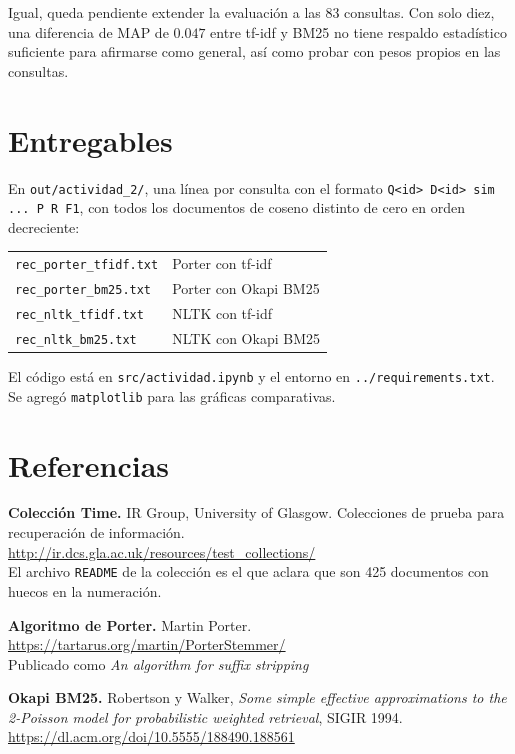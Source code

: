 \documentclass[11pt,letterpaper]{article}
\begin{document}
Igual, queda pendiente extender la evaluación a las 83 consultas. Con solo
diez, una diferencia de MAP de $0.047$ entre tf-idf y BM25 no tiene
respaldo estadístico suficiente para afirmarse como general, así como
probar con pesos propios en las consultas.

\section*{Entregables}

En \texttt{out/actividad\_2/}, una línea por consulta con el formato
\texttt{Q<id> D<id> sim ... P R F1}, con todos los documentos de
coseno distinto de cero en orden decreciente:

\begin{center}
\begin{tabular}{ll}
    \toprule
    \texttt{rec\_porter\_tfidf.txt} & Porter con tf-idf \\
    \texttt{rec\_porter\_bm25.txt}  & Porter con Okapi BM25 \\
    \texttt{rec\_nltk\_tfidf.txt}   & NLTK con tf-idf \\
    \texttt{rec\_nltk\_bm25.txt}    & NLTK con Okapi BM25 \\
    \bottomrule
\end{tabular}
\end{center}

El código está en \texttt{src/actividad.ipynb} y el entorno en
\texttt{../requirements.txt}. Se agregó \texttt{matplotlib} para las
gráficas comparativas.

\section*{Referencias}

\begin{enumerate}[label={[\arabic*]}, itemsep=0.3em, leftmargin=*]
    \item \textbf{Colección Time.} IR Group, University of Glasgow.
          Colecciones de prueba para recuperación de información.\\
          \url{http://ir.dcs.gla.ac.uk/resources/test_collections/}\\
          El archivo \texttt{README} de la colección es el que aclara
          que son 425 documentos con huecos en la numeración.
    \item \textbf{Algoritmo de Porter.} Martin Porter.\\
          \url{https://tartarus.org/martin/PorterStemmer/}\\
          Publicado como \emph{An algorithm for suffix stripping}
    \item \textbf{Okapi BM25.} Robertson y Walker,
          \emph{Some simple effective approximations to the 2-Poisson
          model for probabilistic weighted retrieval}, SIGIR 1994.\\
          \url{https://dl.acm.org/doi/10.5555/188490.188561}
\end{enumerate}

\appendix
\end{document}
